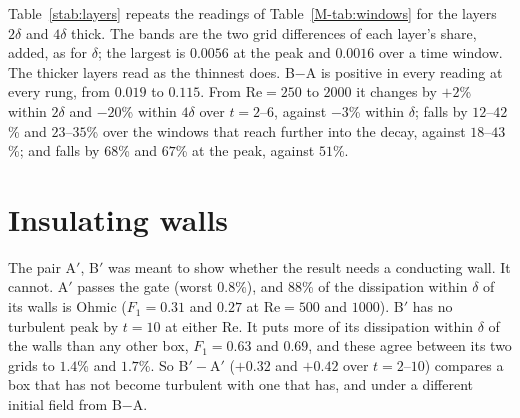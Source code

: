 \documentclass[aip,pop,reprint,amsmath,amssymb,superscriptaddress,floatfix]{revtex4-2}
\newcommand{\Rey}{\mathrm{Re}}
\begin{document}
Table~\ref{stab:layers} repeats the readings of Table~\ref{M-tab:windows} for the
layers $2\delta$ and $4\delta$ thick. The bands are the two grid differences of each
layer's share, added, as for $\delta$; the largest is $0.0056$ at the peak and
$0.0016$ over a time window. The thicker layers read as the thinnest does. B$-$A is
positive in every reading at every rung, from $0.019$ to $0.115$. From $\Rey=250$ to
$2000$ it changes by $+2$\% within $2\delta$ and $-20$\% within $4\delta$ over
$t=2$--$6$, against $-3$\% within $\delta$; falls by $12$--$42$\% and $23$--$35$\%
over the windows that reach further into the decay, against $18$--$43$\%; and falls by
$68$\% and $67$\% at the peak, against $51$\%.

\begin{table}
\caption{\label{stab:layers}B$-$A in the share of the dissipation within $m\delta$
of the walls, at the turbulent peak and integrated over the time windows of
Table~\ref{M-tab:windows}, on the finer grid of each rung. The last column is the
change from $\Rey=250$ to $2000$.}
\begin{ruledtabular}

\end{ruledtabular}
\end{table}

\section{Insulating walls}
\label{s:insul}

The pair A$'$, B$'$ was meant to show whether the result needs a conducting wall. It
cannot. A$'$ passes the gate (worst $0.8$\%), and $88$\% of the dissipation within
$\delta$ of its walls is Ohmic ($F_1=0.31$ and $0.27$ at $\Rey=500$ and $1000$). B$'$
has no turbulent peak by $t=10$ at either $\Rey$. It puts more of its dissipation
within $\delta$ of the walls than any other box, $F_1=0.63$ and $0.69$, and these
agree between its two grids to $1.4$\% and $1.7$\%. So B$'-$A$'$ ($+0.32$ and $+0.42$
over $t=2$--$10$) compares a box that has not become turbulent with one that has, and
under a different initial field from B$-$A.
\end{document}
